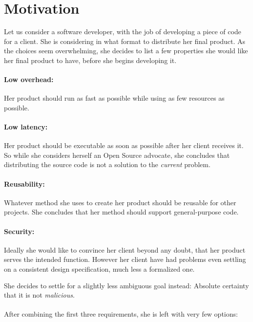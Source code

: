 \section{Motivation}

Let us consider a software developer, with the job of developing a piece of code
for a client. She is considering in what format to distribute her final product.
As the choices seem overwhelming, she decides to list a few properties she would
like her final product to have, before she begins developing it.

\paragraph{Low overhead:}
Her product should run as fast as possible while using as few resources as
possible.

\paragraph{Low latency:}
Her product should be executable as soon as possible after her client receives
it. So while she considers herself an Open Source advocate, she concludes that
distributing the source code is not a solution to the \emph{current} problem.

\paragraph{Reusability:}
Whatever method she uses to create her product should be reusable for other
projects. She concludes that her method should support general-purpose code.

\paragraph{Security:}
Ideally she would like to convince her client beyond any doubt, that her product
serves the intended function. However her client have had problems even settling
on a consistent design specification, much less a formalized one.

She decides to settle for a slightly less ambiguous goal instead: Absolute
certainty that it is not \emph{malicious}.

\paragraph{}
After combining the first three requirements, she is left with very few options:

